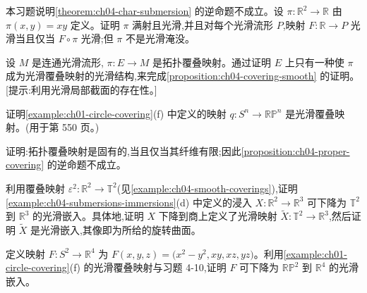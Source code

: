 \documentclass[../../main.tex]{subfiles}
\begin{document}
\begin{exercise}\label{exercise:ch04-p4-8}
本习题说明\cref{theorem:ch04-char-submersion} 的逆命题不成立。设 $\pi:\mathbb{R}^2\to\mathbb{R}$ 由 $\pi(x,y)=xy$ 定义。证明 $\pi$ 满射且光滑,并且对每个光滑流形 $P$,映射 $F:\mathbb{R}\to P$ 光滑当且仅当 $F\circ\pi$ 光滑;但 $\pi$ 不是光滑淹没。
\end{exercise}

\begin{exercise}\label{exercise:ch04-p4-9}
设 $M$ 是连通光滑流形, $\pi:E\to M$ 是拓扑覆叠映射。通过证明 $E$ 上只有一种使 $\pi$ 成为光滑覆叠映射的光滑结构,来完成\cref{proposition:ch04-covering-smooth} 的证明。[提示:利用光滑局部截面的存在性。]
\end{exercise}

\begin{exercise}\label{exercise:ch04-p4-10}
证明\cref{example:ch01-circle-covering}(f) 中定义的映射 $q:S^n\to\mathbb{RP}^n$ 是光滑覆叠映射。(用于第 550 页。)
\end{exercise}

\begin{exercise}\label{exercise:ch04-p4-11}
证明:拓扑覆叠映射是固有的,当且仅当其纤维有限;因此\cref{proposition:ch04-proper-covering} 的逆命题不成立。
\end{exercise}

\begin{exercise}\label{exercise:ch04-p4-12}
利用覆叠映射 $\varepsilon^2:\mathbb{R}^2\to\mathbb{T}^2$(见\cref{example:ch04-smooth-coverings}),证明\cref{example:ch04-submersions-immersions}(d) 中定义的浸入 $X:\mathbb{R}^2\to\mathbb{R}^3$ 可下降为 $\mathbb{T}^2$ 到 $\mathbb{R}^3$ 的光滑嵌入。具体地,证明 $X$ 下降到商上定义了光滑映射 $\widetilde{X}:\mathbb{T}^2\to\mathbb{R}^3$,然后证明 $\widetilde{X}$ 是光滑嵌入,其像即为所给的旋转曲面。
\end{exercise}

\begin{exercise}\label{exercise:ch04-p4-13}
定义映射 $F:S^2\to\mathbb{R}^4$ 为 $F(x,y,z)=\bigl(x^2-y^2,xy,xz,yz\bigr)$。利用\cref{example:ch01-circle-covering}(f) 的光滑覆叠映射与习题 4-10,证明 $F$ 可下降为 $\mathbb{RP}^2$ 到 $\mathbb{R}^4$ 的光滑嵌入。
\end{exercise}
\end{document}
